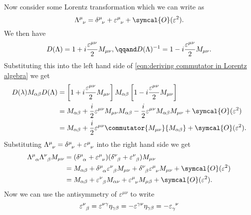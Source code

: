 \documentclass[fleqn]{NotesClass}
\newcommand{\minkowskiMetric}{\eta}
\newcommand{\order}{\symcal{O}}
\begin{document}
    Now consider some Lorentz transformation which we can write as
    \begin{equation}
        \tensor{\Lambda}{^\mu_\nu} = \tensor{\delta}{^\mu_\nu} + \tensor{\varepsilon}{^\mu_\nu} + \order(\varepsilon^2).
    \end{equation}
    We then have
    \begin{equation}
        D(\Lambda) = 1 + i\frac{\varepsilon^{\mu\nu}}{2}M_{\mu\nu}, \qqand D(\Lambda)^{-1} = 1 - i\frac{\varepsilon^{\mu\nu}}{2}M_{\mu\nu}.
    \end{equation}
    Substituting this into the left hand side of \cref{eqn:deriving commutator in Lorentz algebra} we get
    \begin{align}
        D(\lambda)M_{\alpha\beta}D(\Lambda) &= \left[ 1 + i\frac{\varepsilon^{\mu\nu}}{2}M_{\mu\nu} \right] M_{\alpha\beta} \left[ 1 - i\frac{\varepsilon^{\mu\nu}}{2}M_{\mu\nu} \right]\\
        &= M_{\alpha\beta} + \frac{i}{2}\varepsilon^{\mu\nu}M_{\mu\nu}M_{\alpha\beta} - \frac{i}{2}\varepsilon^{\mu\nu}M_{\alpha\beta}M_{\mu\nu} + \order(\varepsilon^2)\\
        &= M_{\alpha\beta} + \frac{i}{2}\varepsilon^{\mu\nu}\commutator{M_{\mu\nu}}{M_{\alpha\beta}} + \order(\varepsilon^2).
    \end{align}
    Substituting \(\tensor{\Lambda}{^\mu_\nu} = \tensor{\delta}{^\mu_\nu} + \tensor{\varepsilon}{^\mu_\nu}\) into the right hand side we get
    \begin{align}
        \tensor{\Lambda}{^\mu_\alpha}\tensor{\Lambda}{^\nu_\beta}M_{\mu\nu} &= (\tensor{\delta}{^\mu_\alpha} + \tensor{\varepsilon}{^\mu_\nu}) (\tensor{\delta}{^\nu_\beta} + \tensor{\varepsilon}{^\nu_\beta})M_{\mu\nu}\\
        &= M_{\alpha\beta} + \tensor{\delta}{^\mu_\alpha}\tensor{\varepsilon}{^\nu_\beta}M_{\mu\nu} + \tensor{\delta}{^\nu_\beta}\tensor{\varepsilon}{^\mu_\nu}M_{\mu\nu} + \order(\varepsilon^2)\\
        &= M_{\alpha\beta} + \tensor{\varepsilon}{^\nu_\beta}M_{\alpha\nu} + \tensor{\varepsilon}{^\mu_\nu}M_{\mu\beta} + \order(\varepsilon^2).
    \end{align}
    Now we can use the antisymmetry of \(\varepsilon^{\mu\nu}\) to write
    \begin{equation}
        \tensor{\varepsilon}{^\nu_\beta} = \varepsilon^{\nu\gamma}\minkowskiMetric_{\gamma\beta} = -\varepsilon^{\gamma\nu}\minkowskiMetric_{\gamma\beta} = -\tensor{\varepsilon}{_\gamma^\nu}
    \end{equation}
\end{document}
